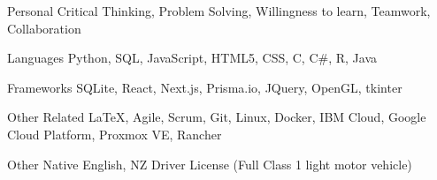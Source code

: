 

\begin{cvskills}

  \cvskill
    {Personal} %
    {Critical Thinking, Problem Solving, Willingness to learn, Teamwork, Collaboration} %

  \cvskill
    {Languages} %
    {Python, SQL, JavaScript, HTML5, CSS, C, C\#, R, Java} %

  \cvskill
    {Frameworks} %
    {SQLite, React, Next.js, Prisma.io, JQuery, OpenGL, tkinter} %

  \cvskill
    {Other Related} %
    {LaTeX, Agile, Scrum, Git, Linux, Docker, IBM Cloud, Google Cloud Platform, Proxmox VE, Rancher} %

  \cvskill
    {Other} %
    {Native English, NZ Driver License (Full Class 1 light motor vehicle)} %


\end{cvskills}
